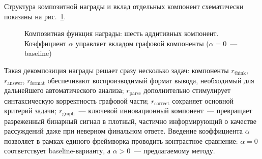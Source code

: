Структура композитной награды и вклад отдельных компонент схематически показаны на рис.~\ref{fig:reward}.

\begin{figure}[H]
\centering
{}
\caption{Композитная функция награды: шесть аддитивных компонент. Коэффициент $\alpha$ управляет вкладом графовой компоненты ($\alpha=0$~--- baseline)}
\label{fig:reward}
\end{figure}

Такая декомпозиция награды решает сразу несколько задач: компоненты $r_{\text{think}}$, $r_{\text{answer}}$, $r_{\text{format}}$ обеспечивают воспроизводимый формат вывода, необходимый для дальнейшего автоматического анализа; $r_{\text{parse}}$ дополнительно стимулирует синтаксическую корректность графовой части; $r_{\text{correct}}$ сохраняет основной критерий задачи; $r_{\text{graph}}$~--- ключевой инновационный компонент~--- превращает разреженный бинарный сигнал в плотный, частично информирующий о качестве рассуждений даже при неверном финальном ответе. Введение коэффициента $\alpha$ позволяет в рамках единого фреймворка проводить контрастное сравнение: $\alpha = 0$ соответствует baseline-варианту, а $\alpha > 0$~--- предлагаемому методу.

